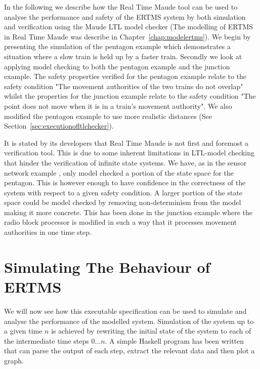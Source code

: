 \label{chapter:verifyertms}\label{chap:verifyertms}


In the following we describe how the Real Time Maude tool can be used to analyse the performance and safety of the ERTMS system by both simulation and verification using the Maude LTL model checker (The modelling of ERTMS in Real Time Maude was describe in Chapter~\ref{chap:modelertms}).  We begin by presenting the simulation of the pentagon example which demonstrates a situation where a slow train is held up by a faster train. Secondly we look at applying model checking to both the pentagon example and the junction example. The safety properties verified for the pentagon example relate to the safety condition "The movement authorities of the two trains do not overlap" whilst the properties for the junction example relate to the safety condition "The point does not move when it is in a train's movement authority". We also modified the pentagon example to use more realistic distances (See Section~\ref{sec:executionofltlchecker}). 

It is stated by its developers that Real Time Maude is not first and foremost a verification tool. This is due to some inherent limitations in LTL-model checking that hinder the verification of infinite state systems. We have, as in the sensor network example \cite{PO07}, only model checked a portion of the state space for the pentagon. This is however enough to have confidence in the correctness of the system with respect to a given safety condition. A larger portion of the state space could be model checked by removing non-determinism from the model making it more concrete. This has been done in the junction example where the radio block processor is modified in such a way that it processes movement authorities in one time step.


\section{Simulating The Behaviour of ERTMS}

We will now see how this executable specification can be used to simulate and analyse the performance of the modelled system. Simulation of the system up to a given time $n$ is achieved by rewriting the initial state of the system to each of the intermediate time steps $0 \ldots n$. A simple Haskell program has been written that can parse the output of each step, extract the relevant data and then plot a graph.

